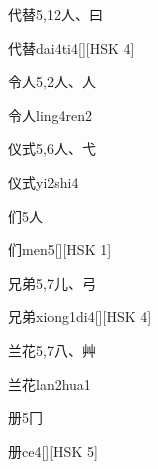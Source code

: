 \begin{entry}{代替}{5,12}{⼈、⽈}
  \begin{phonetics}{代替}{dai4ti4}[][HSK 4]
  \end{phonetics}
\end{entry}

\begin{entry}{令人}{5,2}{⼈、⼈}
  \begin{phonetics}{令人}{ling4ren2}
  \end{phonetics}
\end{entry}

\begin{entry}{仪式}{5,6}{⼈、⼷}
  \begin{phonetics}{仪式}{yi2shi4}
  \end{phonetics}
\end{entry}

\begin{entry}{们}{5}{⼈}
  \begin{phonetics}{们}{men5}[][HSK 1]
  \end{phonetics}
\end{entry}

\begin{entry}{兄弟}{5,7}{⼉、⼸}
  \begin{phonetics}{兄弟}{xiong1di4}[][HSK 4]
  \end{phonetics}
\end{entry}

\begin{entry}{兰花}{5,7}{⼋、⾋}
  \begin{phonetics}{兰花}{lan2hua1}
  \end{phonetics}
\end{entry}

\begin{entry}{册}{5}{⼌}
  \begin{phonetics}{册}{ce4}[][HSK 5]
  \end{phonetics}
\end{entry}

